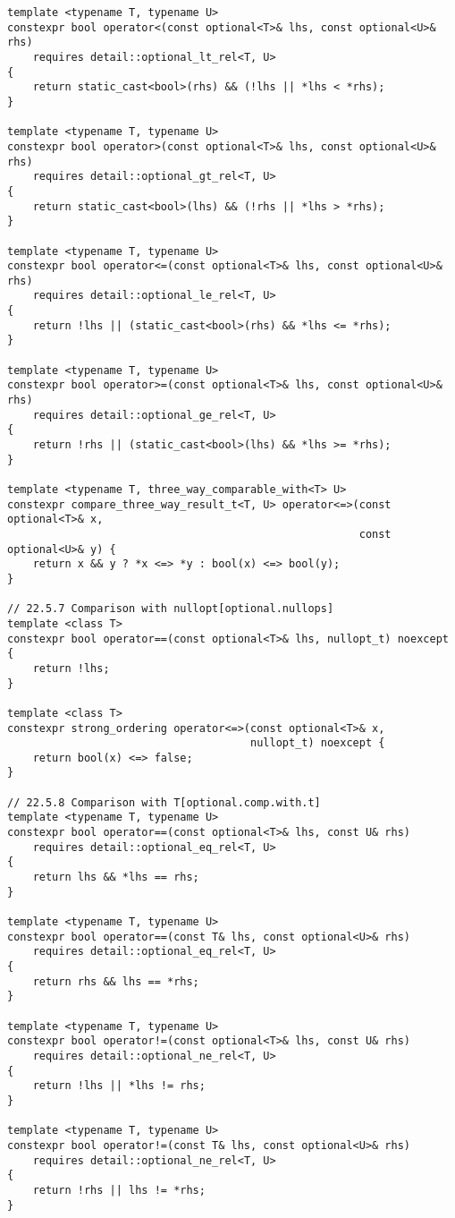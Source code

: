 \documentclass[a4paper,10pt,oneside,openany,final,article]{memoir}
\begin{document}
\begin{verbatim}
template <typename T, typename U>
constexpr bool operator<(const optional<T>& lhs, const optional<U>& rhs)
    requires detail::optional_lt_rel<T, U>
{
    return static_cast<bool>(rhs) && (!lhs || *lhs < *rhs);
}

template <typename T, typename U>
constexpr bool operator>(const optional<T>& lhs, const optional<U>& rhs)
    requires detail::optional_gt_rel<T, U>
{
    return static_cast<bool>(lhs) && (!rhs || *lhs > *rhs);
}

template <typename T, typename U>
constexpr bool operator<=(const optional<T>& lhs, const optional<U>& rhs)
    requires detail::optional_le_rel<T, U>
{
    return !lhs || (static_cast<bool>(rhs) && *lhs <= *rhs);
}

template <typename T, typename U>
constexpr bool operator>=(const optional<T>& lhs, const optional<U>& rhs)
    requires detail::optional_ge_rel<T, U>
{
    return !rhs || (static_cast<bool>(lhs) && *lhs >= *rhs);
}

template <typename T, three_way_comparable_with<T> U>
constexpr compare_three_way_result_t<T, U> operator<=>(const optional<T>& x,
                                                       const optional<U>& y) {
    return x && y ? *x <=> *y : bool(x) <=> bool(y);
}

// 22.5.7 Comparison with nullopt[optional.nullops]
template <class T>
constexpr bool operator==(const optional<T>& lhs, nullopt_t) noexcept {
    return !lhs;
}

template <class T>
constexpr strong_ordering operator<=>(const optional<T>& x,
                                      nullopt_t) noexcept {
    return bool(x) <=> false;
}

// 22.5.8 Comparison with T[optional.comp.with.t]
template <typename T, typename U>
constexpr bool operator==(const optional<T>& lhs, const U& rhs)
    requires detail::optional_eq_rel<T, U>
{
    return lhs && *lhs == rhs;
}

template <typename T, typename U>
constexpr bool operator==(const T& lhs, const optional<U>& rhs)
    requires detail::optional_eq_rel<T, U>
{
    return rhs && lhs == *rhs;
}

template <typename T, typename U>
constexpr bool operator!=(const optional<T>& lhs, const U& rhs)
    requires detail::optional_ne_rel<T, U>
{
    return !lhs || *lhs != rhs;
}

template <typename T, typename U>
constexpr bool operator!=(const T& lhs, const optional<U>& rhs)
    requires detail::optional_ne_rel<T, U>
{
    return !rhs || lhs != *rhs;
}


\end{verbatim}
\end{document}
